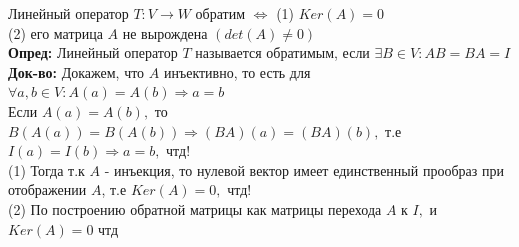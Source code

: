 \documentclass[12pt, oneside]{book}
\theoremstyle{definition}
\begin{document}
\begin{enumerate}
Линейный оператор $T: V \longrightarrow W$ обратим $\Longleftrightarrow$ (1) $Ker(A)=0$\\
(2) его матрица $A$ не вырождена $(det(A) \neq 0)$\\
\textbf{Опред:} Линейный оператор $T$ называется обратимым, если $\exists B \in V: AB=BA=I$\\
\textbf{Док-во:} Докажем, что $A$ инъективно, то есть для $\forall a,b \in V: A(a)=A(b) \Longrightarrow a=b$\\
Если $A(a)=A(b),$ то $B(A(a))=B(A(b)) \Longrightarrow (BA)(a)=(BA)(b),$ т.е $I(a)=I(b) \Longrightarrow a=b,$ чтд!\\
(1) Тогда т.к $A$ - инъекция, то нулевой вектор имеет единственный прообраз при отображении $A$, т.е $Ker(A)=0,$ чтд!\\
(2) По построению обратной матрицы как матрицы перехода $A$ к $I,$ и  $Ker(A)=0$ чтд\\


\end{enumerate}
\end{document}
